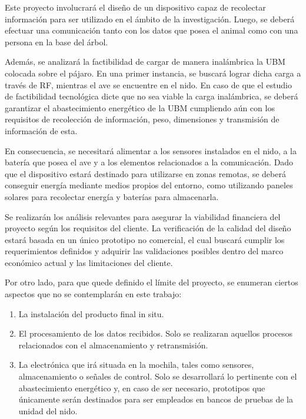 Este proyecto involucrará el diseño de un dispositivo capaz de recolectar información para ser utilizado en el ámbito de la investigación. Luego, se deberá efectuar una comunicación tanto con los datos que posea el animal como con una persona en la base del árbol.

Además, se analizará la factibilidad de cargar de manera inalámbrica la UBM colocada sobre el pájaro. En una primer instancia, se buscará lograr dicha carga a través de RF, mientras el ave se encuentre en el nido. En caso de que el estudio de factibilidad tecnológica dicte que no sea viable la carga inalámbrica, se deberá garantizar el abastecimiento energético de la UBM cumpliendo aún con los requisitos de recolección de información, peso, dimensiones y transmisión de información de esta.

En consecuencia, se necesitará alimentar a los sensores instalados en el nido, a la batería que posea el ave y a los elementos relacionados a la comunicación. Dado que el dispositivo estará destinado para utilizarse en zonas remotas, se deberá conseguir energía mediante medios propios del entorno, como utilizando paneles solares para recolectar energía y baterías para almacenarla.

Se realizarán los análisis relevantes para asegurar la viabilidad financiera del proyecto según los requisitos del cliente. La verificación de la calidad del diseño estará basada en un único prototipo no comercial, el cual buscará cumplir los requerimientos definidos y adquirir las validaciones posibles dentro del marco económico actual y las limitaciones del cliente. 


Por otro lado, para que quede definido el límite del proyecto, se enumeran ciertos aspectos que no se contemplarán en este trabajo:
\begin{enumerate}
	\item La instalación del producto final in situ.
	\item El procesamiento de los datos recibidos. Solo se realizaran aquellos procesos relacionados con el almacenamiento y retransmisión.
	\item La electrónica que irá situada en la mochila, tales como sensores, almacenamiento o señales de control. Solo se desarrollará lo pertinente con el abastecimiento energético y, en caso de ser necesario, prototipos que únicamente serán destinados para ser empleados en bancos de pruebas de la unidad del nido. 
\end{enumerate}

